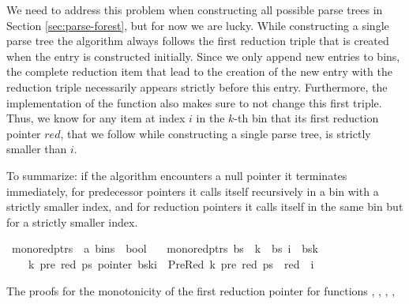 \begin{isabellebody}
\begin{isamarkuptext}
We need to address this problem when constructing all possible parse trees in Section \ref{sec:parse-forest},
but for now we are lucky. While constructing a single parse tree the algorithm always follows the
first reduction triple that is created when the entry is constructed initially. Since we only
append new entries to bins, the complete reduction item that lead to the creation of the new entry with the
reduction triple necessarily appears strictly before this entry. Furthermore, the implementation of the function  also makes sure to not change this
first triple. Thus, we know for any item at index $i$ in the $k$-th bin that its first reduction pointer $red$,
that we follow while constructing a single parse tree, is strictly smaller than $i$.

To summarize:
if the algorithm encounters a null pointer it terminates immediately, for predecessor pointers it
calls itself recursively in a bin with a strictly smaller index, and for reduction pointers it calls
itself in the same bin but for a strictly smaller index.%
\end{isamarkuptext}\isamarkuptrue%
\isamarkupfalse%
\ mono{\isacharunderscore}{\kern0pt}red{\isacharunderscore}{\kern0pt}ptrs\ {\isacharcolon}{\kern0pt}{\isacharcolon}{\kern0pt}\ {\isachardoublequoteopen}{\isacharprime}{\kern0pt}a\ bins\ {\isasymRightarrow}\ bool{\isachardoublequoteclose}\ \isanewline
\ \ {\isachardoublequoteopen}mono{\isacharunderscore}{\kern0pt}red{\isacharunderscore}{\kern0pt}ptrs\ bs\ {\isasymequiv}\ {\isasymforall}k\ {\isacharless}{\kern0pt}\ {\isacharbar}{\kern0pt}bs{\isacharbar}{\kern0pt}{\isachardot}{\kern0pt}\ {\isasymforall}i\ {\isacharless}{\kern0pt}\ {\isacharbar}{\kern0pt}bs{\isacharbang}{\kern0pt}k{\isacharbar}{\kern0pt}{\isachardot}{\kern0pt}\isanewline
\ \ \ \ {\isasymforall}k{\isacharprime}{\kern0pt}\ pre\ red\ ps{\isachardot}{\kern0pt}\ pointer\ {\isacharparenleft}{\kern0pt}bs{\isacharbang}{\kern0pt}k{\isacharbang}{\kern0pt}i{\isacharparenright}{\kern0pt}\ {\isacharequal}{\kern0pt}\ PreRed\ {\isacharparenleft}{\kern0pt}k{\isacharprime}{\kern0pt}{\isacharcomma}{\kern0pt}\ pre{\isacharcomma}{\kern0pt}\ red{\isacharparenright}{\kern0pt}\ ps\ {\isasymlongrightarrow}\ red\ {\isacharless}{\kern0pt}\ i{\isachardoublequoteclose}%
\begin{isamarkuptext}%
The proofs for the monotonicity of the first
reduction pointer for functions , , , ,

\end{isamarkuptext}
\end{isabellebody}
